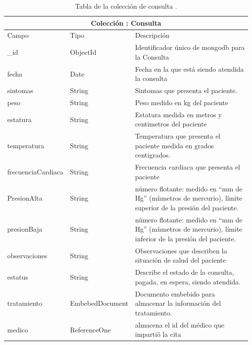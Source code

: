 	
	\begin{table}[htb]
	\centering
	\begin{tabular}{| p{3.5cm}| p{3.0cm} | p{9.8cm} |}
	\hline
	\multicolumn{3}{|c|}{Colección : Consulta} \\
	\hline
	Campo & Tipo &  Descripción\\ \hline
	
	\_id & ObjectId & Identificador único de mongodb para la Consulta \\ \hline
	fecha  & Date & Fecha en la que está siendo atendida la consulta 	\\ \hline
	sintomas & String & Sintomas que presenta el paciente.\\ \hline
	peso & String & Peso medido en kg del paciente \\ \hline
		estatura & String & Estatura medida en metros y centimetros del paciente\\ \hline
		temperatura & String & Temperatura que presenta el paciente medida en grados centigrados. \\ \hline
		frecuenciaCardiaca & String & Frecuencia cardiaca que presenta el paciente \\ \hline
		PresionAlta & String &  número flotante: medido en ``mm de Hg”  (míımetros de mercurio), límite superior de la presión del paciente. \\ \hline
		presionBaja & String &  número flotante: medido en ``mm de Hg”  (míımetros de mercurio), límite inferior de la presión del paciente. \\ \hline
		observaciones & String & Observaciones que describen la situación de salud del paciente \\ \hline
		estatus & String & Describe el estado de la consulta, pagada, en espera, siendo atendida.  \\ \hline
		tratamiento & EmbebedDocument & Documento embebido para almacenar la información del tratamiento. \\ \hline
		medico & ReferenceOne & almacena el id del médico que impartió la cita \\ \hline
	
	\end{tabular}
	\caption{Tabla de la colección de consulta .}
	\label{tabla:diccionarioDatos}
	\end{table}



